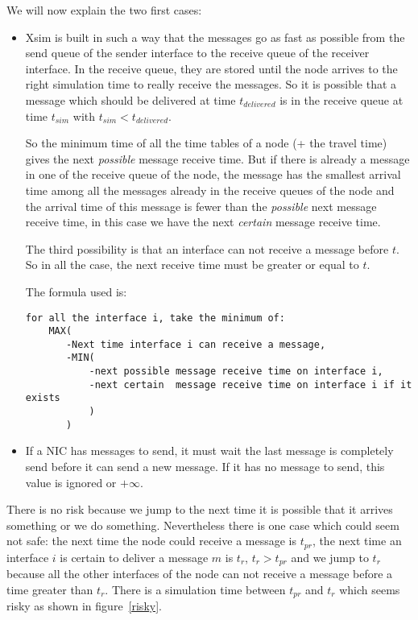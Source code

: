 We will now explain the two first cases:
\begin{itemize}
    \item Xsim is built in such a way that the messages go as fast as possible from the 
    send queue of the sender interface to the receive queue of the receiver interface.
    In the receive queue, they are stored until the node arrives to the right simulation
    time to really receive the messages. So it is possible that a message which should
    be delivered at time $t_{delivered}$ is in the receive queue at time $t_{sim}$ with
    $t_{sim} < t_{delivered}$.

    So the minimum time of all the time tables of a node (+ the travel time) gives the
    next \emph{possible} message receive time. But if there is already a message in 
    one of the receive queue of the node, the message has the smallest arrival time
    among all the messages already in the receive queues of the node and the arrival 
    time of this message is fewer than the \emph{possible} next message receive time, 
    in this case we have the next \emph{certain} message receive time.

    The third possibility is that an interface can not receive a message before $t$.
    So in all the case, the next receive time must be greater or equal to $t$.

    The formula used is:
\begin{verbatim}
for all the interface i, take the minimum of:
    MAX(
       -Next time interface i can receive a message,
       -MIN(
           -next possible message receive time on interface i,
           -next certain  message receive time on interface i if it exists
           )
       )
\end{verbatim}

    \item If a NIC has messages to send, it must wait the last message is completely
    send before it can send a new message. If it has no message to send, this value
    is ignored or $+\infty$.

\end{itemize}


There is no risk because we jump to the next time it is possible that it arrives 
something or we do something. 
Nevertheless there is one case which could seem not safe: 
the next time the node could receive a message is $t_{pr}$,
the next time an interface $i$ is certain to deliver a message $m$ is $t_r$,
$t_r>t_{pr}$ and we jump to $t_r$ because all the other interfaces of
the node can not receive a message before a time greater than $t_r$.
There is a simulation time between $t_{pr}$ and $t_r$ which seems risky
as shown in figure~\ref{risky}.

